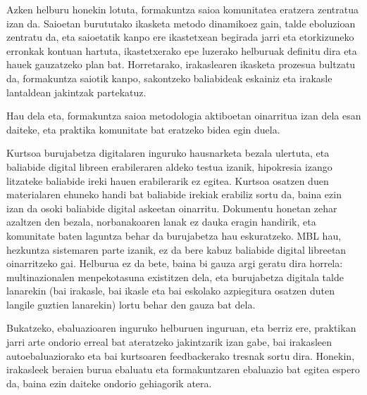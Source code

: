 Azken helburu honekin lotuta, formakuntza saioa komunitatea eratzera zentratua izan da. Saioetan burututako ikasketa metodo dinamikoez gain, talde eboluzioan zentratu da, eta saioetatik kanpo ere ikastetxean begirada jarri eta etorkizuneko erronkak kontuan hartuta, ikastetxerako epe luzerako helburuak definitu dira eta hauek gauzatzeko plan bat. Horretarako, irakaslearen ikasketa prozesua bultzatu da, formakuntza saiotik kanpo, sakontzeko baliabideak eskainiz eta irakasle lantaldean jakintzak partekatuz.

Hau dela eta, formakuntza saioa metodologia aktiboetan oinarritua izan dela esan daiteke, eta praktika komunitate bat eratzeko bidea egin duela.

Kurtsoa burujabetza digitalaren inguruko hausnarketa bezala ulertuta, eta baliabide digital libreen erabileraren aldeko testua izanik, hipokresia izango litzateke baliabide ireki hauen erabilerarik ez egitea. Kurtsoa osatzen duen materialaren ehuneko handi bat baliabide irekiak erabiliz sortu da, baina ezin izan da osoki baliabide digital askeetan oinarritu. Dokumentu honetan zehar azaltzen den bezala, norbanakoaren lanak ez dauka eragin handirik, eta komunitate baten laguntza behar da burujabetza hau eskuratzeko. MBL hau, hezkuntza sistemaren parte izanik, ez da bere kabuz baliabide digital libreetan oinarritzeko gai. Helburua ez da bete, baina bi gauza argi geratu dira horrela: multinazionalen menpekotasuna existitzen dela, eta burujabetza digitala talde lanarekin (bai irakasle, bai ikasle eta bai eskolako azpiegitura osatzen duten langile guztien  lanarekin) lortu behar den gauza bat dela.

Bukatzeko, ebaluazioaren inguruko helburuen inguruan, eta berriz ere, praktikan jarri arte ondorio erreal bat ateratzeko jakintzarik izan gabe, bai irakasleen autoebaluaziorako eta bai kurtsoaren feedbackerako tresnak sortu dira. Honekin, irakasleek beraien burua ebaluatu eta formakuntzaren ebaluazio bat egitea espero da, baina ezin daiteke ondorio gehiagorik atera.  
